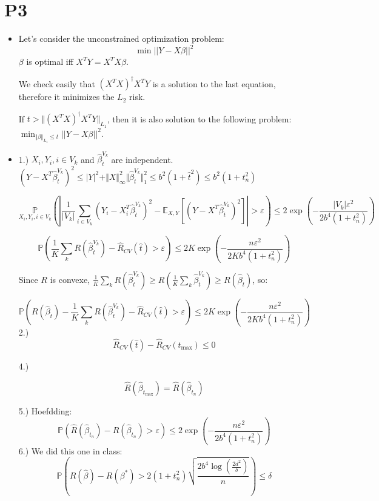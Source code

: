 \documentclass[12pt]{article}
\newcommand{\hbeta}{\hat \beta }
\newcommand{\esp}{{\mathbb E}}
\newcommand{\pr}{{\mathbb P}}
\newcommand{\norm}[1]{\Vert #1 \Vert}
\begin{document}
\section{P3}
\begin{itemize}
\item

  Let's consider the unconstrained optimization problem:
  $$\min ||Y - X \beta||^2$$
  $\beta$ is optimal iff $X^TY = X^TX\beta$.
  
  We check easily that $(X^TX)^{\dagger}X^TY$ is a solution to the last equation, therefore it minimizes the $L_2$ risk.
  
  If $t > \norm{(X^TX)^{\dagger}X^TY}_{L_1}$, then it is also solution to the following problem:   $\min_{\norm{\beta}_{L_1} \le t} ||Y - X \beta||^2$.
  
\item
  1.)
  $X_i, Y_i, i \in V_k$ and $\hbeta_{\hat t}^{V_k}$ are independent.
  $(Y - X^T \hbeta_{\hat t}^{V_k})^2 \le |Y|^2 + \norm{X}_{\infty}^2  \norm{\hbeta_{\hat t}^{V_k}}_1^2 \le b^2 (1 + \hat t^2) \le b^2(1 + t_n^2)$
  
  $$\underset{X_i, Y_i, i \in V_k}{\pr} \left( \left|\frac{1}{|V_k|} \sum_{i \in V_k} (Y_i - X_i^T\hbeta_{\hat t}^{V_k})^2 - \esp_{X, Y}[(Y - X^T\hbeta_{\hat t}^{V_k})^2]\right| > \varepsilon\right) \le 2 \exp( - \frac{|V_k| \varepsilon^2}{2b^4(1 + t_n^2)}) $$

  $${\pr} \left( \frac1K \sum_k R(\hbeta^{V_k}_{\hat t}) - \hat R_{CV}(\hat t) > \varepsilon\right) \le 2K \exp( - \frac{n \varepsilon^2}{2Kb^4(1 + t_n^2)}) $$

  Since $R$ is convexe, $\frac1K \sum_k R(\hbeta^{V_k}_{\hat t}) \ge R(\frac1K \sum_k \hbeta^{V_k}_{\hat t}) \ge R(\hbeta_{\hat t})$, so:

  $${\pr} \left( R(\hbeta_{\hat t}) - \frac1K \sum_k R(\hbeta^{V_k}_{\hat t}) - \hat R_{CV}(\hat t) > \varepsilon\right) \le 2K \exp( - \frac{n \varepsilon^2}{2Kb^4(1 + t_n^2)}) $$
  2.)
  $$\hat R_{CV}(\hat t) - \hat R_{CV}(t_{\max}) \le 0$$

  
  4.)

  $$\hat R(\hbeta_{t_{\max}}) = \hat R(\hbeta_{t_n})$$
  
  5.)  Hoefdding:
  $$ \pr(\hat R(\hbeta_{t_n}) - R(\hbeta_{t_n}) > \varepsilon) \le 2 \exp(-\frac{n \varepsilon^2}{2b^4(1+t_n^2)})$$
  6.) We did this one in class:
  $$\pr\left(R(\hat \beta) - R(\beta^*) > 2 (1 + t_n^2) \sqrt{\frac{2b^4\log(\frac{2d^2}{\delta})}n} \right) \le \delta$$
\end{itemize}
\end{document}
